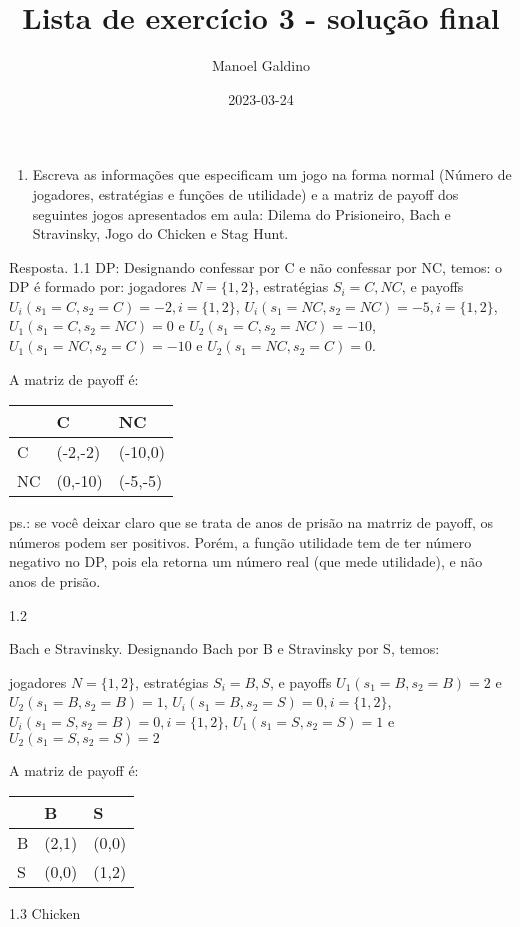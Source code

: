 \documentclass[
]{article}
\title{Lista de exercício 3 - solução final}
\author{Manoel Galdino}
\date{2023-03-24}
\providecommand{\tightlist}{%
  \setlength{\itemsep}{0pt}\setlength{\parskip}{0pt}}
\begin{document}
\maketitle

\begin{enumerate}
\def\labelenumi{\arabic{enumi}.}
\tightlist
\item
  Escreva as informações que especificam um jogo na forma normal (Número
  de jogadores, estratégias e funções de utilidade) e a matriz de payoff
  dos seguintes jogos apresentados em aula: Dilema do Prisioneiro, Bach
  e Stravinsky, Jogo do Chicken e Stag Hunt.
\end{enumerate}

Resposta. 1.1 DP: Designando confessar por C e não confessar por NC,
temos: o DP é formado por: jogadores \(N = \{1,2\}\), estratégias
\(S_i = {C, NC}\), e payoffs \(U_i(s_1=C, s_2=C) = -2, i = \{1,2\}\),
\(U_i(s_1=NC, s_2=NC) = -5, i = \{1,2\}\), \(U_1(s_1=C, s_2=NC) = 0\) e
\(U_2(s_1=C, s_2=NC) = -10\), \(U_1(s_1=NC, s_2=C) = -10\) e
\(U_2(s_1=NC, s_2=C) = 0\).

A matriz de payoff é:

\begin{longtable}[]{@{}lll@{}}
\toprule
& C & NC\tabularnewline
\midrule
\endhead
C & (-2,-2) & (-10,0)\tabularnewline
NC & (0,-10) & (-5,-5)\tabularnewline
\bottomrule
\end{longtable}

ps.: se você deixar claro que se trata de anos de prisão na matrriz de
payoff, os números podem ser positivos. Porém, a função utilidade tem de
ter número negativo no DP, pois ela retorna um número real (que mede
utilidade), e não anos de prisão.

1.2

Bach e Stravinsky. Designando Bach por B e Stravinsky por S, temos:

jogadores \(N = \{1,2\}\), estratégias \(S_i = {B, S}\), e payoffs
\(U_1(s_1=B, s_2=B) = 2\) e \(U_2(s_1=B, s_2=B) = 1\),
\(U_i(s_1=B, s_2=S) = 0, i = \{1,2\}\),
\(U_i(s_1=S, s_2=B) = 0, i = \{1,2\}\), \(U_1(s_1=S, s_2=S) = 1\) e
\(U_2(s_1=S, s_2=S) = 2\)

A matriz de payoff é:

\begin{longtable}[]{@{}lll@{}}
\toprule
& B & S\tabularnewline
\midrule
\endhead
B & (2,1) & (0,0)\tabularnewline
S & (0,0) & (1,2)\tabularnewline
\bottomrule
\end{longtable}

1.3 Chicken
\end{document}
